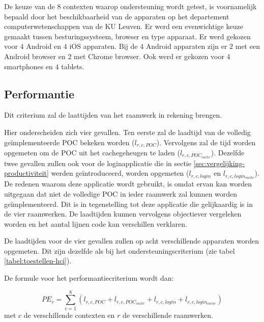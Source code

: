 De keuze van de $8$ contexten waarop ondersteuning wordt getest, is voornamelijk bepaald door het beschikbaarheid van de apparaten op het departement computerwetenschappen van de KU Leuven.
Er werd een evenwichtige keuze gemaakt tussen besturingssysteem,  browser en type apparaat.
Er werd gekozen voor $4$ Android en $4$ iOS apparaten.
Bij de $4$ Android apparaten zijn er $2$ met een Android browser en $2$ met Chrome browser.
Ook werd er gekozen voor $4$ smartphones en $4$ tablets.


\subsection{Performantie}
\label{sec:vergelijking-performantie}
Dit criterium zal de laattijden van het raamwerk in rekening brengen.


Hier onderscheiden zich vier gevallen.
Ten eerste zal de laadtijd van de volledig geïmplementeerde POC bekeken worden ($l_{r,c,POC}$). 
Vervolgens zal de tijd worden opgemeten om de POC uit het cachegeheugen te laden ($l_{r,c,POC_{cache}}$).
Dezelfde twee gevallen zullen ook voor de loginapplicatie die in sectie \ref{sec:vergelijking-productiviteit} werden geïntroduceerd, worden opgemeten ($l_{r,c,login}$ en $l_{r,c,login_{cache}}$).
De redenen waarom deze applicatie wordt gebruikt, is omdat ervan kan worden uitgegaan dat niet de volledige POC in ieder raamwerk zal kunnen worden geïmplementeerd. 
Dit is in tegenstelling tot deze applicatie die gelijkaardig is in de vier raamwerken.
De laadtijden kunnen vervolgens objectiever vergeleken worden en het aantal lijnen code kan verschillen verklaren.

De laadtijden voor de vier gevallen zullen op acht verschillende apparaten worden opgemeten.
Dit zijn dezelfde als bij het ondersteuningscriterium (zie tabel \ref{tabel:toestellen-hci}).

De formule voor het performantiecriterium wordt dan: 

\begin{equation}
  PE_r= \sum_{c=1}^{8}{\left(l_{r,c,POC}+l_{r,c,POC_{cache}}+l_{r,c,login}+l_{r,c,login_{cache}}\right)} 
  \label{eq:performantie}
\end{equation}
met $c$ de verschillende contexten en $r$ de verschillende raamwerken.

